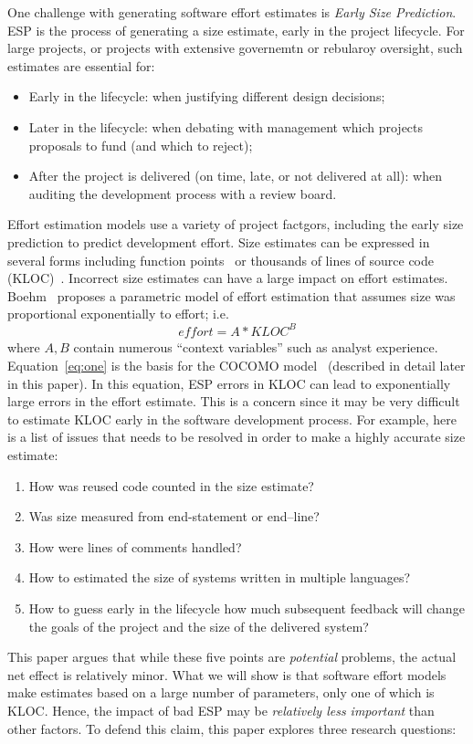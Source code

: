 \documentclass[final,twocolumn]{elsarticle}
\newcommand{\bi}{\begin{itemize}[leftmargin=0.4cm]}
\newcommand{\ei}{\end{itemize}}
\newcommand{\be}{\begin{enumerate}}
\newcommand{\ee}{\end{enumerate}}
\newcommand{\eq}[1]{Equation~\ref{eq:#1}}
\theoremstyle{break}
\begin{document}
One challenge with generating software effort estimates
is  {\em Early Size Prediction}. ESP is the process of generating a size
estimate, early in the project lifecycle. For large projects, or projects
with extensive governemtn or rebularoy oversight, such estimates are  essential for:
\bi
\item Early in the lifecycle: when justifying different design decisions; 
\item Later in the lifecycle: when debating with management which projects proposals to fund (and which to reject);
\item After the project is delivered (on time, late, or not delivered at all):
      when auditing the development process with a review board.
\ei
Effort estimation models use a variety of project factgors, including the early size prediction
to predict development effort.
Size estimates can be expressed in several
forms including function points~\cite{Albrecht83} or  thousands of lines of
source code (KLOC)~\cite{boehm81}.
Incorrect size estimates can have a large impact on effort estimates. 
Boehm~\cite{boehm81} proposes a parametric model of effort estimation that
  assumes size was proportional exponentially to effort; i.e.
  \begin{equation}\label{eq:one}
    \mathit{effort} = \mathit{A*KLOC}^B
    \end{equation}
  where $A,B$ contain numerous ``context variables'' such as analyst experience.
  \eq{one} is the basis for the COCOMO model~\cite{boehm81,boehm00b}  (described in detail later in this paper).
  In this equation, ESP errors in KLOC can lead to exponentially large errors
  in the  effort estimate.
  This is a concern since it may be very difficult to estimate KLOC
  early in the software development process.
  For example, here is a list of issues that needs to be resolved in order
  to make a highly accurate size estimate:
\be
\item How was reused code counted in the size estimate?
\item  Was size measured from end-statement or end--line?
\item How were lines of comments handled?
\item How to estimated the size of systems written in multiple languages?
\item
  How to guess early in the lifecycle
  how much subsequent  feedback will change
  the goals of the project and the size of the delivered system?
  \ee
  This paper argues that while these five points are {\em potential} problems, the actual
  net effect is relatively minor.
What we will show is that software effort models make estimates based on a large number of parameters, only one 
of which is KLOC. 
Hence, the impact of bad ESP  may be 
{\em relatively less important} than other factors.
To defend this claim, this paper explores three research questions:
\end{document}
